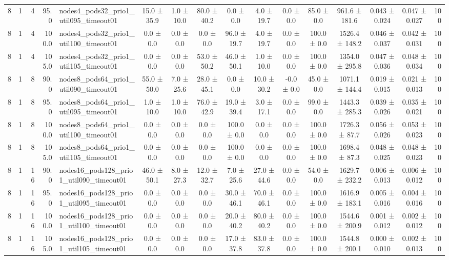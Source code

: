 \begin{tabular}{r r r r l c c c c c c c c c c r}
8 & 1 & 4 & 95.0 & nodes4\_pods32\_prio1\_util095\_timeout01 & 15.0 ± 35.9 & 1.0 ± 10.0 & 80.0 ± 40.2 & 0.0 ± 0.0 & 4.0 ± 19.7 & 0.0 ± 0.0 & 85.0 ± 0.0 & 961.6 ± 181.6 & 0.043 ± 0.024 & 0.047 ± 0.027 & 100 \\
8 & 1 & 4 & 100.0 & nodes4\_pods32\_prio1\_util100\_timeout01 & 0.0 ± 0.0 & 0.0 ± 0.0 & 0.0 ± 0.0 & 96.0 ± 19.7 & 4.0 ± 19.7 & 0.0 ± 0.0 & 100.0 ± 0.0 & 1526.4 ± 148.2 & 0.046 ± 0.037 & 0.042 ± 0.031 & 100 \\
8 & 1 & 4 & 105.0 & nodes4\_pods32\_prio1\_util105\_timeout01 & 0.0 ± 0.0 & 0.0 ± 0.0 & 53.0 ± 50.2 & 46.0 ± 50.1 & 1.0 ± 10.0 & 0.0 ± 0.0 & 100.0 ± 0.0 & 1354.0 ± 295.8 & 0.047 ± 0.036 & 0.048 ± 0.034 & 100 \\
8 & 1 & 8 & 90.0 & nodes8\_pods64\_prio1\_util090\_timeout01 & 55.0 ± 50.0 & 7.0 ± 25.6 & 28.0 ± 45.1 & 0.0 ± 0.0 & 10.0 ± 30.2 & -0.0 ± 0.0 & 45.0 ± 0.0 & 1071.1 ± 144.4 & 0.019 ± 0.015 & 0.021 ± 0.013 & 100 \\
8 & 1 & 8 & 95.0 & nodes8\_pods64\_prio1\_util095\_timeout01 & 1.0 ± 10.0 & 1.0 ± 10.0 & 76.0 ± 42.9 & 19.0 ± 39.4 & 3.0 ± 17.1 & 0.0 ± 0.0 & 99.0 ± 0.0 & 1443.3 ± 285.3 & 0.039 ± 0.026 & 0.035 ± 0.021 & 100 \\
8 & 1 & 8 & 100.0 & nodes8\_pods64\_prio1\_util100\_timeout01 & 0.0 ± 0.0 & 0.0 ± 0.0 & 0.0 ± 0.0 & 100.0 ± 0.0 & 0.0 ± 0.0 & 0.0 ± 0.0 & 100.0 ± 0.0 & 1726.3 ± 87.7 & 0.056 ± 0.026 & 0.053 ± 0.023 & 100 \\
8 & 1 & 8 & 105.0 & nodes8\_pods64\_prio1\_util105\_timeout01 & 0.0 ± 0.0 & 0.0 ± 0.0 & 0.0 ± 0.0 & 100.0 ± 0.0 & 0.0 ± 0.0 & 0.0 ± 0.0 & 100.0 ± 0.0 & 1698.4 ± 87.3 & 0.048 ± 0.025 & 0.048 ± 0.023 & 100 \\
8 & 1 & 16 & 90.0 & nodes16\_pods128\_prio1\_util090\_timeout01 & 46.0 ± 50.1 & 8.0 ± 27.3 & 12.0 ± 32.7 & 7.0 ± 25.6 & 27.0 ± 44.6 & 0.0 ± 0.0 & 54.0 ± 0.0 & 1629.7 ± 232.2 & 0.006 ± 0.013 & 0.006 ± 0.012 & 100 \\
8 & 1 & 16 & 95.0 & nodes16\_pods128\_prio1\_util095\_timeout01 & 0.0 ± 0.0 & 0.0 ± 0.0 & 0.0 ± 0.0 & 30.0 ± 46.1 & 70.0 ± 46.1 & 0.0 ± 0.0 & 100.0 ± 0.0 & 1616.9 ± 183.1 & 0.005 ± 0.016 & 0.004 ± 0.016 & 100 \\
8 & 1 & 16 & 100.0 & nodes16\_pods128\_prio1\_util100\_timeout01 & 0.0 ± 0.0 & 0.0 ± 0.0 & 0.0 ± 0.0 & 20.0 ± 40.2 & 80.0 ± 40.2 & 0.0 ± 0.0 & 100.0 ± 0.0 & 1544.6 ± 200.9 & 0.001 ± 0.012 & 0.002 ± 0.012 & 100 \\
8 & 1 & 16 & 105.0 & nodes16\_pods128\_prio1\_util105\_timeout01 & 0.0 ± 0.0 & 0.0 ± 0.0 & 0.0 ± 0.0 & 17.0 ± 37.8 & 83.0 ± 37.8 & 0.0 ± 0.0 & 100.0 ± 0.0 & 1544.8 ± 200.1 & 0.000 ± 0.010 & 0.002 ± 0.013 & 100 \\

\end{tabular}
